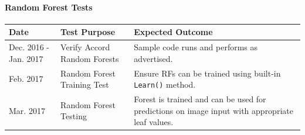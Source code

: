 \documentclass[12pt]{article}
\begin{document}
\paragraph{Random Forest Tests}\label{random-forest-tests}

\begin{longtable}[]{@{}lll@{}}
\toprule
\begin{minipage}[b]{0.06\columnwidth}\raggedright\strut
Date\strut
\end{minipage} & \begin{minipage}[b]{0.16\columnwidth}\raggedright\strut
Test Purpose\strut
\end{minipage} & \begin{minipage}[b]{0.22\columnwidth}\raggedright\strut
Expected Outcome\strut
\end{minipage}\tabularnewline
\midrule
\endhead
\begin{minipage}[t]{0.06\columnwidth}\raggedright\strut
Dec. 2016 - Jan. 2017\strut
\end{minipage} & \begin{minipage}[t]{0.16\columnwidth}\raggedright\strut
Verify Accord Random Forests\strut
\end{minipage} & \begin{minipage}[t]{0.22\columnwidth}\raggedright\strut
Sample code runs and performs as advertised.\strut
\end{minipage}\tabularnewline
\begin{minipage}[t]{0.06\columnwidth}\raggedright\strut
Feb. 2017\strut
\end{minipage} & \begin{minipage}[t]{0.16\columnwidth}\raggedright\strut
Random Forest Training Test\strut
\end{minipage} & \begin{minipage}[t]{0.22\columnwidth}\raggedright\strut
Ensure RFs can be trained using built-in \texttt{Learn()} method.\strut
\end{minipage}\tabularnewline
\begin{minipage}[t]{0.06\columnwidth}\raggedright\strut
Mar. 2017\strut
\end{minipage} & \begin{minipage}[t]{0.16\columnwidth}\raggedright\strut
Random Forest Testing\strut
\end{minipage} & \begin{minipage}[t]{0.22\columnwidth}\raggedright\strut
Forest is trained and can be used for predictions on image input with
appropriate leaf values.\strut

\end{minipage}
\end{longtable}
\end{document}
